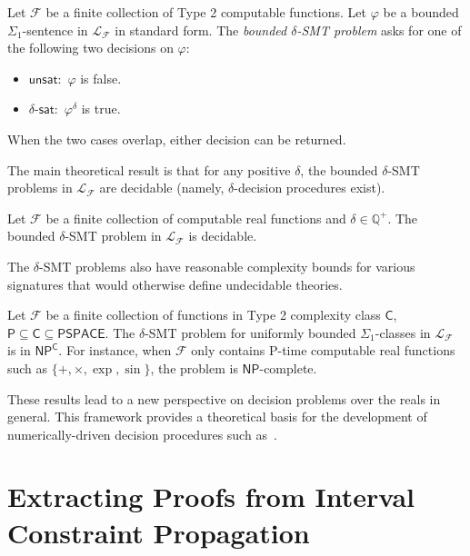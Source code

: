 \documentclass[envcountsect]{llncs}
\begin{document}
\begin{definition} Let
$\mathcal{F}$ be a finite collection of Type 2 computable functions. Let
$\varphi$ be a bounded $\Sigma_1$-sentence in $\mathcal{L}_{\mathcal{F}}$ in
standard form. The {\em bounded $\delta$-SMT problem} asks for one of the
following two decisions on $\varphi$:
\begin{itemize}
\item $\mathsf{unsat}:$ $\varphi$ is false.
\item $\delta$-$\mathsf{sat}:$ $\varphi^{\delta}$ is true.
\end{itemize}
When the two cases overlap, either decision can be returned.
\end{definition}

The main theoretical result is that for any positive
$\delta$, the bounded $\delta$-SMT problems in $\mathcal{L}_{\mathcal{F}}$ are
decidable (namely, $\delta$-decision
procedures exist).
\begin{theorem}[Decidability] Let $\mathcal{F}$ be a finite collection
of computable real functions and $\delta\in \mathbb{Q}^+$. The bounded
$\delta$-SMT problem in $\mathcal{L}_{\mathcal{F}}$ is decidable.
\end{theorem}

The $\delta$-SMT problems also have reasonable complexity bounds for various
signatures that would otherwise define undecidable theories.
\begin{theorem}[Complexity]
Let $\mathcal{F}$ be a finite collection of functions in Type 2 complexity class
$\mathsf{C}$, $\mathsf{P}\subseteq\mathsf{C}\subseteq\mathsf{PSPACE}$. The
$\delta$-SMT problem for uniformly bounded $\Sigma_1$-classes in
$\mathcal{L}_{\mathcal{F}}$ is in $\mathsf{NP^C}$. For instance, when
$\mathcal{F}$ only contains {\sf P}-time computable real functions such as
$\{+, \times, \exp, \sin\}$, the problem is $\mathsf{NP}$-complete.
\end{theorem}

These results lead to a
new perspective on decision problems over the reals in general.
This framework provides a theoretical basis for the development of
numerically-driven decision procedures such as~\cite{}.

\section{Extracting Proofs from Interval Constraint Propagation}\label{icp}
\end{document}
